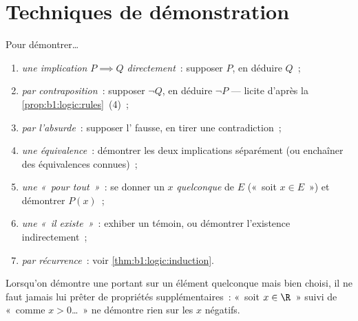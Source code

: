 \section{Techniques de démonstration}

\begin{method}\label{met:b1:logic:proofs}
Pour démontrer\dots
\begin{enumerate}
  \item \emph{une implication $P \implies Q$ directement}~: supposer
        $P$, en déduire $Q$~;
  \item \emph{par contraposition}~: supposer $\lnot Q$, en déduire
        $\lnot P$ --- licite d'après la \cref{prop:b1:logic:rules}~(4)~;
  \item \emph{par l'absurde}~: supposer l' fausse, en tirer
        une contradiction~;
  \item \emph{une équivalence}~: démontrer les deux implications
        séparément (ou enchaîner des équivalences connues)~;
  \item \emph{une  «~pour tout~»}~: se donner un $x$
        \emph{quelconque} de $E$ («~soit $x \in E$~») et démontrer
        $P(x)$~;
  \item \emph{une  «~il existe~»}~: exhiber un témoin, ou
        démontrer l'existence indirectement~;
  \item \emph{par récurrence}~: voir \cref{thm:b1:logic:induction}.
\end{enumerate}
Lorsqu'on démontre une  portant sur un élément quelconque mais
bien choisi, il ne faut jamais lui prêter de propriétés supplémentaires~:
«~soit $x \in \R$~» suivi de «~comme $x > 0$\dots~» ne démontre rien sur
les $x$ négatifs.
\end{method}

